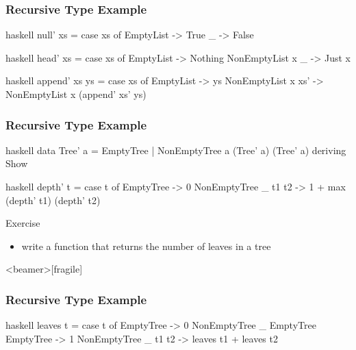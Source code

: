 \documentclass[dvipsnames]{beamer}
\theoremstyle{plain}
\begin{document}
\begin{frame}[fragile]
  \frametitle{Recursive Type Example}

  \begin{example}[Haskell]
    \begin{pygments}{haskell}
null' xs =
    case xs of
      EmptyList -> True
      _ -> False
    \end{pygments}

    \pause
    \smallskip
    \begin{pygments}{haskell}
head' xs =
    case xs of
      EmptyList -> Nothing
      NonEmptyList x _ -> Just x
    \end{pygments}

    \pause
    \smallskip
    \begin{pygments}{haskell}
append' xs ys =
    case xs of
      EmptyList -> ys
      NonEmptyList x xs' -> NonEmptyList x (append' xs' ys)
    \end{pygments}
  \end{example}
\end{frame}

\begin{frame}[fragile]
  \frametitle{Recursive Type Example}

  \begin{example}
    \begin{pygments}{haskell}
data Tree' a = EmptyTree
             | NonEmptyTree a (Tree' a) (Tree' a)
             deriving Show
    \end{pygments}

    \pause
    \begin{pygments}{haskell}
depth' t =
    case t of
      EmptyTree -> 0
      NonEmptyTree _ t1 t2 -> 1 + max (depth' t1) (depth' t2)
    \end{pygments}
  \end{example}

  \pause
  \begin{block}{Exercise}
    \begin{itemize}
      \item write a function that returns the number of leaves in a tree
    \end{itemize}
  \end{block}
\end{frame}

\begin{frame}<beamer>[fragile]
  \frametitle{Recursive Type Example}

  \begin{example}
    \pause
    \begin{pygments}{haskell}
leaves t =
    case t of
      EmptyTree -> 0
      NonEmptyTree _ EmptyTree EmptyTree -> 1
      NonEmptyTree _ t1 t2 -> leaves t1 + leaves t2
    \end{pygments}
  \end{example}
\end{frame}
\end{document}
